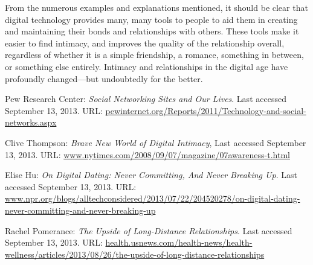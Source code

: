 \documentclass[11pt,a4paper]{article}
\begin{document}
From the numerous examples and explanations mentioned, it should be clear that digital technology provides many, many tools to people to aid them in creating and maintaining their bonds and relationships with others. These tools make it easier to find intimacy, and improves the quality of the relationship overall, regardless of whether it is a simple friendship, a romance, something in between, or something else entirely. Intimacy and relationships in the digital age have profoundly changed---but undoubtedly for the better.


\vspace{0.75cm}


\begin{center}
\end{center}

\newpage
\color{spot}
\begin{thebibliography}{99}
\color{black}
 Pew Research Center:
\emph{Social Networking Sites and Our Lives}. Last accessed September 13, 2013. URL: \url{pewinternet.org/Reports/2011/Technology-and-social-networks.aspx}

 Clive Thompson: \emph{Brave New World of Digital Intimacy}, Last accessed September 13, 2013. URL: \url{www.nytimes.com/2008/09/07/magazine/07awareness-t.html}

 Elise Hu: \emph{On Digital Dating: Never Committing, And Never Breaking Up}. Last accessed September 13, 2013. URL: \url{www.npr.org/blogs/alltechconsidered/2013/07/22/204520278/on-digital-dating-never-committing-and-never-breaking-up}

 Rachel Pomerance: \emph{The Upside of Long-Distance Relationships}. Last accessed September 13, 2013. URL: \url{health.usnews.com/health-news/health-wellness/articles/2013/08/26/the-upside-of-long-distance-relationships}
\end{thebibliography}
\end{document}
